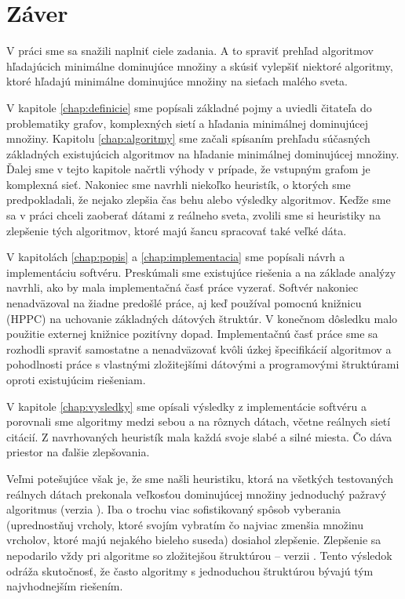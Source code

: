 \cleardoublepage
{}
{}
\chapter*{Záver}\label{chap:zaver}

V práci sme sa snažili naplniť ciele zadania. A to spraviť prehľad algoritmov 
hľadajúcich minimálne dominujúce množiny a skúsiť vylepšiť niektoré algoritmy, 
ktoré hľadajú minimálne dominujúce množiny na sieťach malého sveta. 

V kapitole \ref{chap:definicie} sme popísali základné pojmy a uviedli čitateľa 
do problematiky grafov, komplexných sietí a hľadania minimálnej dominujúcej 
množiny. Kapitolu \ref{chap:algoritmy} sme začali spísaním prehľadu súčasných 
základných existujúcich algoritmov na hľadanie minimálnej dominujúcej množiny. 
Ďalej sme v tejto kapitole načrtli výhody v prípade, že vstupným grafom je 
komplexná sieť. Nakoniec sme navrhli niekoľko heuristík, o ktorých sme 
predpokladali, že nejako zlepšia čas behu alebo výsledky algoritmov. Keďže 
sme sa v práci chceli zaoberať dátami z reálneho sveta, zvolili sme si 
heuristiky na zlepšenie tých algoritmov, ktoré majú šancu spracovať také veľké 
dáta.

V kapitolách \ref{chap:popis} a \ref{chap:implementacia} sme popísali návrh a 
implementáciu softvéru. Preskúmali sme existujúce riešenia a na základe analýzy 
navrhli, ako by mala implementačná časť práce vyzerať.
Softvér nakoniec nenadväzoval na žiadne predošlé práce, aj keď 
používal pomocnú knižnicu (HPPC) na uchovanie základných dátových štruktúr. 
V konečnom dôsledku malo použitie externej knižnice pozitívny dopad. 
Implementačnú časť práce sme sa rozhodli spraviť samostatne a nenadväzovať 
kvôli úzkej špecifikácií algoritmov a pohodlnosti práce s vlastnými 
zložitejšími dátovými a programovými štruktúrami oproti existujúcim riešeniam.

V kapitole \ref{chap:vysledky} sme opísali výsledky z implementácie softvéru a 
porovnali sme algoritmy medzi sebou a na rôznych dátach, včetne reálnych sietí 
citácií. Z navrhovaných heuristík mala každá svoje slabé a silné miesta. 
Čo dáva priestor na ďalšie zlepšovania. 

Veľmi potešujúce však je, že sme našli heuristiku, ktorá na všetkých 
testovaných reálnych dátach prekonala veľkosťou dominujúcej množiny 
jednoduchý pažravý algoritmus (verzia ). Iba o trochu viac 
sofistikovaný spôsob vyberania (uprednostňuj vrcholy, ktoré svojím vybratím 
čo najviac zmenšia množinu vrcholov, ktoré majú nejakého bieleho suseda) 
dosiahol zlepšenie. Zlepšenie sa nepodarilo vždy pri algoritme so zložitejšou 
štruktúrou -- verzii .
Tento výsledok odráža skutočnosť, že často algoritmy s 
jednoduchou štruktúrou bývajú tým najvhodnejším riešením.

